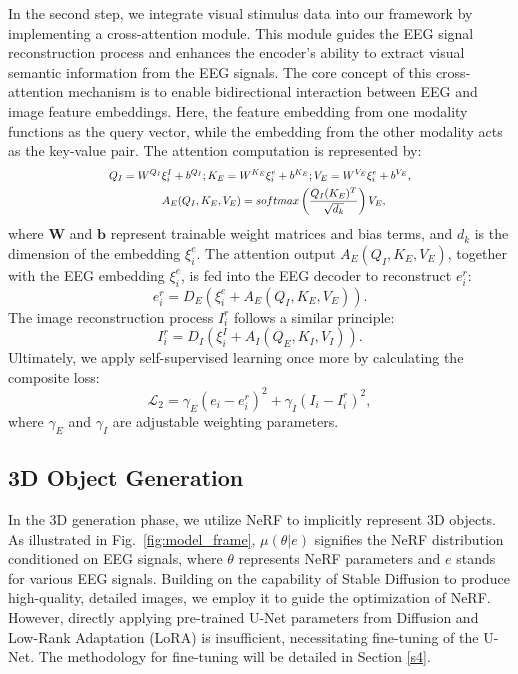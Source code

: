 \documentclass[conference]{IEEEtran}
\begin{document}
In the second step, we integrate visual stimulus data into our framework by implementing a cross-attention module. This module guides the EEG signal reconstruction process and enhances the encoder's ability to extract visual semantic information from the EEG signals. The core concept of this cross-attention mechanism is to enable bidirectional interaction between EEG and image feature embeddings. Here, the feature embedding from one modality functions as the query vector, while the embedding from the other modality acts as the key-value pair. The attention computation is represented by: 
\begin{equation}
\scalebox{0.8}{ $
\begin{aligned}
Q_I=W^{Q_I}&\xi_i^{I}+b^{Q_I}; K_E=W^{K_E}\xi_i^{e}+b^{K_E};
    V_E=W^{V_E}\xi_i^{e}+b^{V_E},\\
    &A_E(Q_I,K_E,V_E)=softmax\left( \frac{Q_I(K_E)^T}{\sqrt{d_k}} \right)V_E,
\end{aligned}$
}
\end{equation}
where $\mathbf{W}$ and $\mathbf{b}$ represent trainable weight matrices and bias terms, and \(d_k\) is the dimension of the embedding \(\xi_i^{e}\). The attention output \(A_E(Q_I, K_E, V_E)\), together with the EEG embedding \(\xi_i^{e}\), is fed into the EEG decoder to reconstruct \(e_i^r\):
\begin{equation}
    e_i^r=D_E(\xi_i^{e}+A_E(Q_I,K_E,V_E)).
\end{equation}
The image reconstruction process \(I_i^r\) follows a similar principle:
\begin{equation}
    I_i^r=D_I(\xi_i^{I}+A_I(Q_E,K_I,V_I)).
\end{equation}
Ultimately, we apply self-supervised learning once more by calculating the composite loss:
\begin{equation}\label{equ_reri}
    \mathcal{L}_2=\gamma_E(e_i-e_i^r)^2+\gamma_I(I_i-I_i^r)^2,
\end{equation}
where $\gamma_E$ and $\gamma_I$ are adjustable weighting parameters.


\subsection{3D Object Generation}\label{s3}
In the 3D generation phase, we utilize NeRF to implicitly represent 3D objects. As illustrated in Fig.~\ref{fig:model_frame}, $ \mu(\theta|e) $ signifies the NeRF distribution conditioned on EEG signals, where $ \theta $ represents NeRF parameters and $ e $ stands for various EEG signals. Building on the capability of Stable Diffusion to produce high-quality, detailed images, we employ it to guide the optimization of NeRF. However, directly applying pre-trained U-Net parameters from Diffusion and Low-Rank Adaptation (LoRA) \cite{b22} is insufficient, necessitating fine-tuning of the U-Net. The methodology for fine-tuning will be detailed in Section \ref{s4}.
\end{document}
